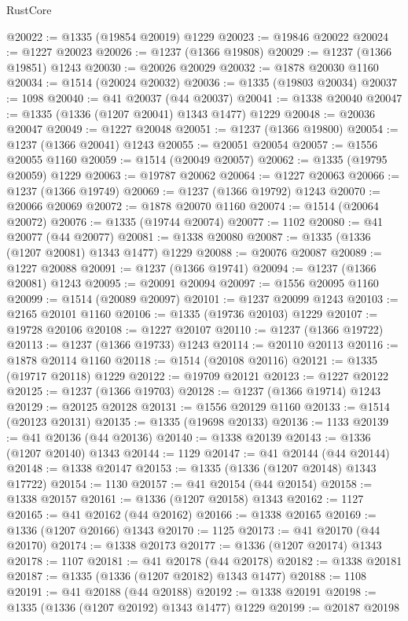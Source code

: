 \begin{lexlean}{RustCore}
\begin{coremodule}
@20022 := @1335 (@19854 @20019) @1229
@20023 := @19846 @20022
@20024 := @1227 @20023
@20026 := @1237 (@1366 @19808)
@20029 := @1237 (@1366 @19851) @1243
@20030 := @20026 @20029
@20032 := @1878 @20030 @1160
@20034 := @1514 (@20024 @20032)
@20036 := @1335 (@19803 @20034)
@20037 := 1098
@20040 := @41 @20037 (@44 @20037)
@20041 := @1338 @20040
@20047 := @1335 (@1336 (@1207 @20041) @1343 @1477) @1229
@20048 := @20036 @20047
@20049 := @1227 @20048
@20051 := @1237 (@1366 @19800)
@20054 := @1237 (@1366 @20041) @1243
@20055 := @20051 @20054
@20057 := @1556 @20055 @1160
@20059 := @1514 (@20049 @20057)
@20062 := @1335 (@19795 @20059) @1229
@20063 := @19787 @20062
@20064 := @1227 @20063
@20066 := @1237 (@1366 @19749)
@20069 := @1237 (@1366 @19792) @1243
@20070 := @20066 @20069
@20072 := @1878 @20070 @1160
@20074 := @1514 (@20064 @20072)
@20076 := @1335 (@19744 @20074)
@20077 := 1102
@20080 := @41 @20077 (@44 @20077)
@20081 := @1338 @20080
@20087 := @1335 (@1336 (@1207 @20081) @1343 @1477) @1229
@20088 := @20076 @20087
@20089 := @1227 @20088
@20091 := @1237 (@1366 @19741)
@20094 := @1237 (@1366 @20081) @1243
@20095 := @20091 @20094
@20097 := @1556 @20095 @1160
@20099 := @1514 (@20089 @20097)
@20101 := @1237 @20099 @1243
@20103 := @2165 @20101 @1160
@20106 := @1335 (@19736 @20103) @1229
@20107 := @19728 @20106
@20108 := @1227 @20107
@20110 := @1237 (@1366 @19722)
@20113 := @1237 (@1366 @19733) @1243
@20114 := @20110 @20113
@20116 := @1878 @20114 @1160
@20118 := @1514 (@20108 @20116)
@20121 := @1335 (@19717 @20118) @1229
@20122 := @19709 @20121
@20123 := @1227 @20122
@20125 := @1237 (@1366 @19703)
@20128 := @1237 (@1366 @19714) @1243
@20129 := @20125 @20128
@20131 := @1556 @20129 @1160
@20133 := @1514 (@20123 @20131)
@20135 := @1335 (@19698 @20133)
@20136 := 1133
@20139 := @41 @20136 (@44 @20136)
@20140 := @1338 @20139
@20143 := @1336 (@1207 @20140) @1343
@20144 := 1129
@20147 := @41 @20144 (@44 @20144)
@20148 := @1338 @20147
@20153 := @1335 (@1336 (@1207 @20148) @1343 @17722)
@20154 := 1130
@20157 := @41 @20154 (@44 @20154)
@20158 := @1338 @20157
@20161 := @1336 (@1207 @20158) @1343
@20162 := 1127
@20165 := @41 @20162 (@44 @20162)
@20166 := @1338 @20165
@20169 := @1336 (@1207 @20166) @1343
@20170 := 1125
@20173 := @41 @20170 (@44 @20170)
@20174 := @1338 @20173
@20177 := @1336 (@1207 @20174) @1343
@20178 := 1107
@20181 := @41 @20178 (@44 @20178)
@20182 := @1338 @20181
@20187 := @1335 (@1336 (@1207 @20182) @1343 @1477)
@20188 := 1108
@20191 := @41 @20188 (@44 @20188)
@20192 := @1338 @20191
@20198 := @1335 (@1336 (@1207 @20192) @1343 @1477) @1229
@20199 := @20187 @20198

\end{coremodule}
\end{lexlean}
